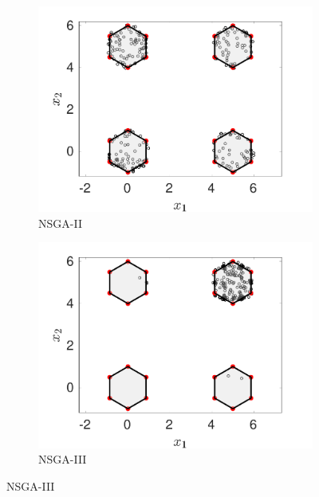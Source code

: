 \documentclass[conference]{IEEEtran}
\begin{document}
\begin{figure}[htbp]
    \centering
    \begin{subfigure}[b]{.22\textwidth}
    \includegraphics[width=\linewidth]{Section5/dim2/PS/NSGAII}
    \caption{NSGA-II}
    \end{subfigure}
    \begin{subfigure}[b]{.22\textwidth}
    \includegraphics[width=\linewidth]{Section5/dim2/PS/NSGAIII}
    \caption{NSGA-III}
    \end{subfigure}
    

\end{figure}
\end{document}
